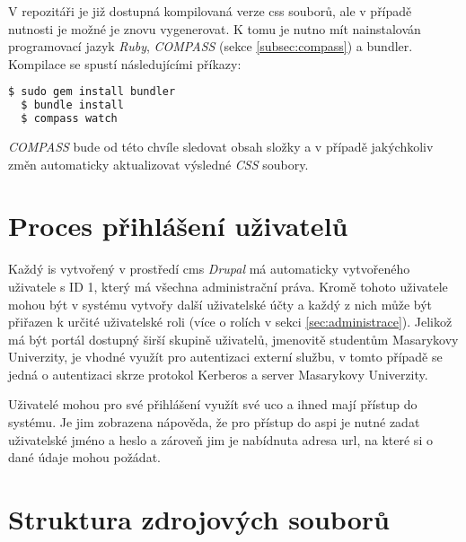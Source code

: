 V repozitáři je již dostupná kompilovaná verze \gls{css} souborů, ale v případě nutnosti je možné je znovu vygenerovat. K tomu je nutno mít nainstalován programovací jazyk \emph{Ruby}, \emph{COMPASS} (sekce \ref{subsec:compass}) a \gls{bundler}. Kompilace se spustí následujícími příkazy:

\begin{lstlisting}[language=bash]
  $ sudo gem install bundler
  $ bundle install
  $ compass watch
\end{lstlisting}

\emph{COMPASS} bude od této chvíle sledovat obsah složky a v případě jakýchkoliv změn automaticky aktualizovat výsledné \emph{CSS} soubory.

\section{Proces přihlášení uživatelů}

Každý \gls{is} vytvořený v prostředí \gls{cms} \emph{Drupal} má automaticky vytvořeného uživatele s ID 1, který má všechna administrační práva. Kromě tohoto uživatele mohou být v systému vytvořy další uživatelské účty a každý z nich může být přiřazen k určité uživatelské roli (více o rolích v sekci \ref{sec:administrace}). Jelikož má být portál dostupný širší skupině uživatelů, jmenovitě studentům Masarykovy Univerzity, je vhodné využít pro autentizaci externí službu, v tomto případě se jedná o autentizaci skrze protokol Kerberos a server Masarykovy Univerzity. 

Uživatelé mohou pro své přihlášení využít své \gls{uco} a ihned mají přístup do systému. Je jim zobrazena nápověda, že pro přístup do \gls{aspi} je nutné zadat uživatelské jméno a heslo a zároveň jim je nabídnuta adresa \gls{url}, na které si o dané údaje mohou požádat. 

\section{Struktura zdrojových souborů}

